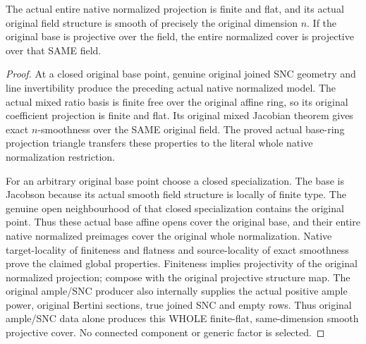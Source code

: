 \begin{lemma}
\label{lem:kn-nadel-whole-global-cover-finite-smooth}
\leanok
{}
The actual entire native normalized projection is finite and flat, and its actual
original field structure is smooth of precisely the original dimension $n$.
If the original base is projective over the field, the entire normalized cover
is projective over that SAME field.
\end{lemma}
\begin{proof}
At a closed original base point, genuine original joined SNC geometry and line
invertibility produce the preceding actual native normalized model. The actual
mixed ratio basis is finite free over the original affine ring, so its
original coefficient projection is finite and flat. Its original mixed Jacobian theorem
gives exact $n$-smoothness over the SAME original field. The proved actual
base-ring projection triangle transfers these properties to the literal whole
native normalization restriction.

For an arbitrary original base point choose a closed specialization. The base
is Jacobson because its actual smooth field structure is locally of finite
type. The genuine open neighbourhood of that closed specialization contains
the original point. Thus these actual base affine opens cover the original
base, and their entire native normalized preimages cover the original whole
normalization. Native target-locality of finiteness and flatness and source-locality of
exact smoothness prove the claimed global properties. Finiteness implies
projectivity of the original normalized projection; compose with the original
projective structure map. The original ample/SNC producer also internally supplies
the actual positive ample power, original Bertini sections, true joined SNC and
empty rows. Thus original ample/SNC data alone produces this WHOLE finite-flat,
same-dimension smooth projective cover. No connected component or generic
factor is selected.
\end{proof}

